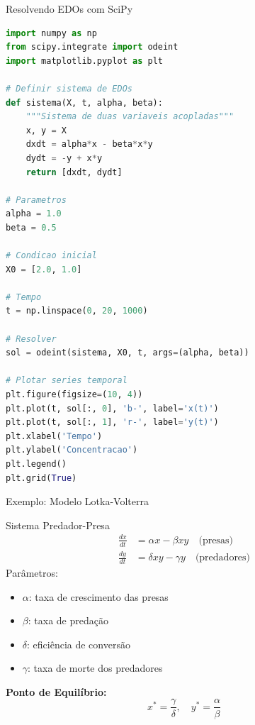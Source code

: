 \begin{frame}{Resolvendo EDOs com SciPy}
\begin{lstlisting}[language=Python, caption=Sistema de EDOs com scipy.integrate, basicstyle=\ttfamily\footnotesize]
import numpy as np
from scipy.integrate import odeint
import matplotlib.pyplot as plt

# Definir sistema de EDOs
def sistema(X, t, alpha, beta):
    """Sistema de duas variaveis acopladas"""
    x, y = X
    dxdt = alpha*x - beta*x*y
    dydt = -y + x*y
    return [dxdt, dydt]

# Parametros
alpha = 1.0
beta = 0.5

# Condicao inicial
X0 = [2.0, 1.0]

# Tempo
t = np.linspace(0, 20, 1000)

# Resolver
sol = odeint(sistema, X0, t, args=(alpha, beta))

# Plotar series temporal
plt.figure(figsize=(10, 4))
plt.plot(t, sol[:, 0], 'b-', label='x(t)')
plt.plot(t, sol[:, 1], 'r-', label='y(t)')
plt.xlabel('Tempo')
plt.ylabel('Concentracao')
plt.legend()
plt.grid(True)
\end{lstlisting}
\end{frame}

\begin{frame}[allowframebreaks]{Exemplo: Modelo Lotka-Volterra}
\begin{block}{Sistema Predador-Presa}
\begin{align*}
\frac{dx}{dt} &= \alpha x - \beta xy \quad \text{(presas)}\\
\frac{dy}{dt} &= \delta xy - \gamma y \quad \text{(predadores)}
\end{align*}
Parâmetros:
\begin{itemize}
    \item $\alpha$: taxa de crescimento das presas
    \item $\beta$: taxa de predação
    \item $\delta$: eficiência de conversão
    \item $\gamma$: taxa de morte dos predadores
\end{itemize}
\end{block}

\vspace{0.3cm}

\textbf{Ponto de Equilíbrio:}
\begin{equation*}
x^* = \frac{\gamma}{\delta}, \quad y^* = \frac{\alpha}{\beta}
\end{equation*}

\end{frame}

